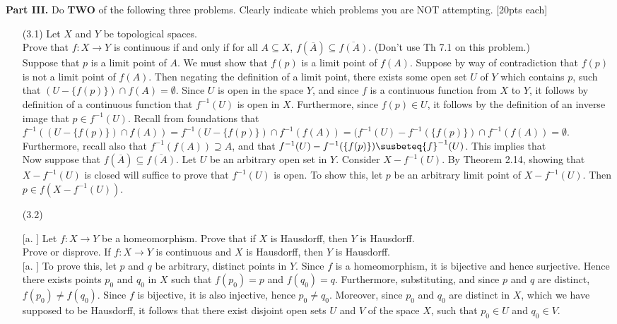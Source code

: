 \documentclass[13pt]{article}
\theoremstyle{remark}
\newcommand{\inv}[1]{{#1}^{-1}}
\begin{document}
\noindent \textbf{Part III.} Do \textbf{TWO} of the following three problems.  Clearly indicate which problems you are NOT attempting.  \hfill [20pts each]
\begin{enumerate}

\item[(3.1)]  Let $X$ and $Y$ be topological spaces. \\
Prove that $f: X \rightarrow Y$ is continuous if and only if for all $A \subseteq X$, $f(\overline{A}) \subseteq \overline{f(A)}$.  (Don't use Th 7.1 on this problem.)\\

 Suppose that $p$ is a limit point of $A$. We must show that $f(p)$ is a limit point of $f(A)$. Suppose by way of contradiction that $f(p)$ is not a limit point of $f(A)$. Then negating the definition of a limit point, there exists some open set $U$ of $Y$ which contains $p$, such that $(U- \{f(p)\})\cap f(A) = \emptyset$. Since $U$ is open in the space $Y$, and since $f$ is a continuous function from $X$ to $Y$, it follows by definition of a continuous function that $\inv{f}(U)$ is open in $X$. Furthermore, since $f(p)\in U$, it follows by the definition of an inverse image that $p\in \inv{f}(U)$. Recall from foundations that $\inv{f}((U- \{f(p)\})\cap f(A)) = \inv{f}(U-\{f(p)\})\cap \inv{f}(f(A)) = (\inv{f}(U) - \inv{f}(\{f(p)\})\cap\inv{f}(f(A)) = \emptyset$. Furthermore, recall also that $\inv{f}(f(A))\supseteq A$, and that $\inv{f}(U)-\inv{f}(\{f(p)\})\susbeteq \inv{f}(U)$. This implies that $ $
\\
Now suppose that $f(\overline{A})\subseteq \overline{f(A)}$. Let $U$ be an arbitrary open set in $Y$. Consider $X- \inv{f}(U)$. By Theorem 2.14, showing that $X-\inv{f}(U)$ is closed will suffice to prove that $\inv{f}(U)$ is open. To show this, let $p$ be an arbitrary limit point of $X- \inv{f}(U)$. Then $p\in f(X - \inv{f}(U))$.

\item[(3.2)]

    [a. ] Let $f: X \rightarrow Y$ be a homeomorphism.  Prove that if $X$ is Hausdorff, then $Y$ is Hausdorff.\\
    [b. ] Prove or disprove.  If $f: X \rightarrow Y$ is continuous and $X$ is Hausdorff, then $Y$ is Hausdorff.\\



    [a. ] To prove this, let $p$ and $q$ be arbitrary, distinct points in $Y$. Since $f$ is a homeomorphism, it is bijective and hence surjective. Hence there exists points $p_0$ and $q_0$ in $X$ such that $f(p_0) = p$ and $f(q_0) = q$. Furthermore, substituting, and since $p$ and $q$ are distinct, $f(p_0) \ne f(q_0)$. Since $f$ is bijective, it is also injective, hence $p_0\ne q_0$. Moreover, since $p_0$ and $q_0$ are distinct in $X$, which we have supposed to be Hausdorff, it follows that there exist disjoint open sets $U$ and $V$ of the space $X$, such that $p_0\in U$ and $q_0\in V$. \\
    

\end{enumerate}
\end{document}
